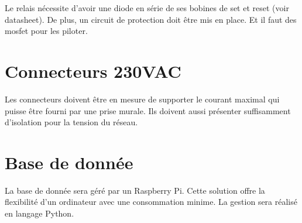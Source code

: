 Le relais nécessite d'avoir une diode en série de ses bobines de set et reset (voir datasheet).
De plus, un circuit de protection doit être mis en place. Et il faut des mosfet pour les piloter.

\section{Connecteurs 230VAC}
Les connecteurs doivent être en mesure de supporter le courant maximal qui puisse être fourni par une prise murale. Ils doivent aussi présenter suffisamment d'isolation pour la tension du réseau.


\section{Base de donnée}
La base de donnée sera géré par un Raspberry Pi. Cette solution offre la flexibilité d'un ordinateur avec une consommation minime. La gestion sera réalisé en langage Python.
